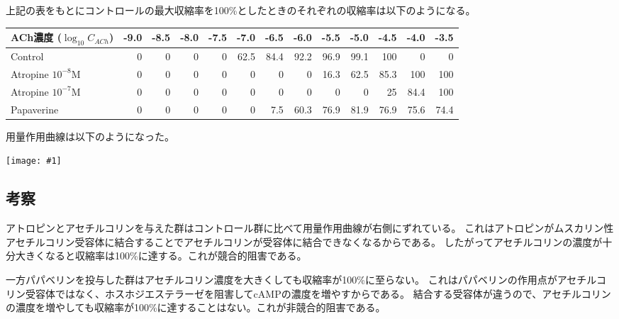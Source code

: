 \documentclass[a4paper,papersize,dvipdfmx]{jsarticle}
\newcommand{\pic}[1]{\begin{center} \texttt{[image: \#1]} \end{center}}   %
\begin{document}
上記の表をもとにコントロールの最大収縮率を100\%としたときのそれぞれの収縮率は以下のようになる。

\begin{table}[H]
\centering
\begin{tabular}{@{}lrrrrrrrrrrrr@{}}
\toprule
ACh濃度 ($\log_{10} {C_{ACh}}$) & -9.0 & -8.5 & -8.0 & -7.5 & -7.0   & -6.5   & -6.0  & -5.5   & -5.0  & -4.5 & -4.0 & -3.5 \\ \midrule
Control     & 0  & 0    & 0  & 0    & 62.5 & 84.4 & 92.2 & 96.9 & 99.1 & 100     & 0      & 0      \\
Atropine $10^{-8}$M & 0  & 0    & 0  & 0    & 0    & 0      & 0       & 16.3  & 62.5    & 85.3 & 100    & 100    \\
Atropine $10^{-7}$M & 0  & 0    & 0  & 0    & 0    & 0      & 0       & 0      & 0       & 25      & 84.4 & 100    \\
Papaverine  & 0  & 0    & 0  & 0    & 0    & 7.5    & 60.3 & 76.9 & 81.9  & 76.9  & 75.6 & 74.4 \\ \bottomrule
\end{tabular}
\end{table}


用量作用曲線は以下のようになった。

\pic{ys_curve.png}


\subsection*{考察}
アトロピンとアセチルコリンを与えた群はコントロール群に比べて用量作用曲線が右側にずれている。
これはアトロピンがムスカリン性アセチルコリン受容体に結合することでアセチルコリンが受容体に結合できなくなるからである。
したがってアセチルコリンの濃度が十分大きくなると収縮率は100\%に達する。これが競合的阻害である。

一方パパベリンを投与した群はアセチルコリン濃度を大きくしても収縮率が100\%に至らない。
これはパパベリンの作用点がアセチルコリン受容体ではなく、ホスホジエステラーゼを阻害してcAMPの濃度を増やすからである。
結合する受容体が違うので、アセチルコリンの濃度を増やしても収縮率が100\%に達することはない。これが非競合的阻害である。
\end{document}
